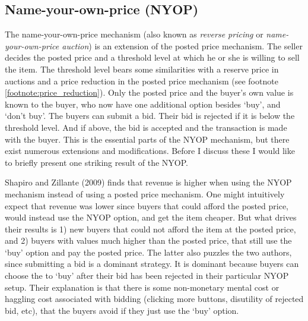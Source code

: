 \documentclass[a4paper,12pt]{article}
\begin{document}
	\subsection{Name-your-own-price (NYOP)}

	The name-your-own-price mechanism (also known as {\it reverse pricing} or {\it name-your-own-price auction}) is an extension of the posted price mechanism. The seller decides the posted price and a threshold level at which he or she is willing to sell the item. The threshold level bears some similarities with a reserve price in auctions and a price reduction in the posted price mechanism (see footnote \ref{footnote:price_reduction}). Only the posted price and the buyer's own value is known to the buyer, who now have one additional option besides `buy', and `don't buy'. The buyers can submit a bid. Their bid is rejected if it is below the threshold level. And if above, the bid is accepted and the transaction is made with the buyer. This is the essential parts of the NYOP mechanism, but there exist numerous extensions and modifications. Before I discuss these I would like to briefly present one striking result of the NYOP.

	Shapiro and Zillante (2009) finds that revenue is higher when using the NYOP mechanism instead of using a posted price mechanism. One might intuitively expect that revenue was lower since buyers that could afford the posted price, would instead use the NYOP option, and get the item cheaper. But what drives their results is 1) new buyers that could not afford the item at the posted price, and 2) buyers with values much higher than the posted price, that still use the `buy' option and pay the posted price. The latter also puzzles the two authors, since submitting a bid is a dominant strategy. It is dominant because buyers can choose the to `buy' after their bid has been rejected in their particular NYOP setup. Their explanation is that there is some non-monetary mental cost or haggling cost associated with bidding (clicking more buttons, disutility of rejected bid, etc), that the buyers avoid if they just use the `buy' option.
\end{document}
